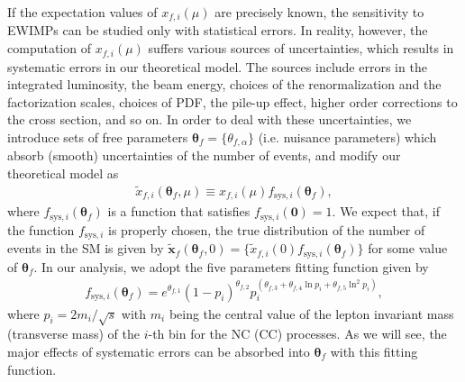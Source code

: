 \documentclass[12pt, a4paper]{article}
\begin{document}
If the expectation values of $x_{f,i} (\mu)$ are precisely known, the
sensitivity to EWIMPs can be studied only with statistical errors.  In
reality, however, the computation of $x_{f,i} (\mu)$ suffers various
sources of uncertainties, which results in systematic errors in our
theoretical model.  The sources include errors in the integrated
luminosity, the beam energy, choices of the renormalization and the
factorization scales, choices of PDF, the pile-up effect, higher order
corrections to the cross section, and so on.  In order to deal with
these uncertainties, we introduce sets of free parameters $\bm{\theta}_f
= \{ \theta_{f,\alpha} \}$ (i.e. nuisance parameters) which absorb
(smooth) uncertainties of the number of events, and modify our
theoretical model as
\begin{align}
\tilde{x}_{f,i} (\bm{\theta}_f, \mu) \equiv x_{f,i} (\mu)
 f_{\mathrm{sys}, i}(\bm{\theta}_f),\label{eq_xtilde}
\end{align}
where $f_{\mathrm{sys}, i}(\bm{\theta}_f)$ is a function that satisfies
$f_{\mathrm{sys}, i}(\bm{0}) =1$.  We expect that, if the function
$f_{\mathrm{sys}, i}$ is properly chosen, the true distribution of the
number of events in the SM is given by $\tilde{\bm{x}}_f
(\bm{\theta}_f,0) = \{ \tilde{x}_{f,i} (0) f_{\mathrm{sys},
i}(\bm{\theta}_f)\}$ for some value of $\bm{\theta}_f$.  In our
analysis, we adopt the five parameters fitting function given
by~\cite{Aaltonen:2008dn}
\begin{align}
 f_{\mathrm{sys}, i} (\bm{\theta}_f) =
 e^{\theta_{f,1}} (1 - p_i)^{\theta_{f,2}}
 p_i^{(\theta_{f,3} + \theta_{f,4} \ln p_i + \theta_{f,5} \ln^2 p_i)},\label{eq_f_theta}
\end{align}
where $p_i = 2m_{i} / \sqrt{s}$ with $m_i$ being the central value of
the lepton invariant mass (transverse mass) of the $i$-th bin for the NC
(CC) processes.  As we will see, the major effects of systematic errors
can be absorbed into $\bm{\theta}_f$ with this fitting function.
\end{document}
